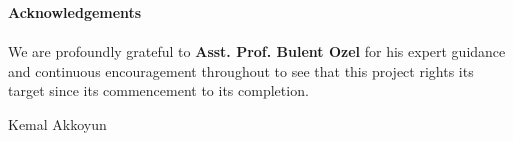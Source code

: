 \begin{center}
\thispagestyle{empty}
\LARGE{\textbf{Acknowledgements}}\\[1cm]
\end{center}
\linespread{1.13}
\large{\paragraph{}We are profoundly grateful to \textbf{Asst. Prof. Bulent Ozel} for his expert guidance
and continuous encouragement throughout to see that this project rights its
target since its commencement to its completion.}
\begin{flushright}
{
Kemal Akkoyun
}
\end{flushright}
\newpage
